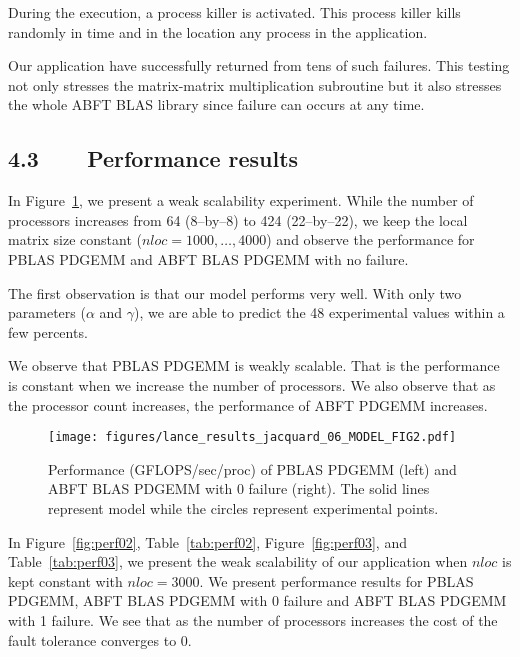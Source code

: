 \documentclass[pdftex,11pt]{article}
\begin{document}
During the execution, a process killer is activated.  This process
killer kills randomly in time and in the location any process in the
application.

Our application have successfully returned from tens of such failures.
This testing not only stresses the matrix-matrix multiplication
subroutine but it also stresses the whole ABFT BLAS library since
failure can occurs at any time.


\subsection*{\color{DodgerBlue4} 4.3~~~~Performance results}

In Figure~\ref{fig:perf01}, we present a weak scalability experiment.
While the number of processors increases from 64 (8--by--8) to 424
(22--by--22), we keep the local matrix size constant ($nloc = 1000,
\ldots, 4000$) and observe the performance for PBLAS PDGEMM and ABFT
BLAS PDGEMM with no failure.

The first observation is that our model performs very well. With only
two parameters ($\alpha$ and $\gamma$), we are able to predict the 48
experimental values within a few percents.

We observe that PBLAS PDGEMM is weakly scalable. That is the
performance is constant when we increase the number of processors. We
also observe that as the processor count increases, the performance of
ABFT PDGEMM increases.

\begin{figure}
  \color{DodgerBlue4}
  \begin{center}
    \texttt{[image: figures/lance\_results\_jacquard\_06\_MODEL\_FIG2.pdf]}
    \color{DodgerBlue4}
    \caption{\label{fig:perf01} \color{black} Performance
      (GFLOPS/sec/proc) of PBLAS PDGEMM (left) and ABFT BLAS PDGEMM
      with 0 failure (right).  The solid lines represent model while
      the circles represent experimental points.  }
  \end{center}
\end{figure}

In Figure~\ref{fig:perf02}, Table~\ref{tab:perf02},
Figure~\ref{fig:perf03}, and Table~\ref{tab:perf03}, we present the
weak scalability of our application when $nloc$ is kept constant with
$nloc=3000$. We present performance results for PBLAS PDGEMM, ABFT
BLAS PDGEMM with 0 failure and ABFT BLAS PDGEMM with 1 failure.  We
see that as the number of processors increases the cost of the fault
tolerance converges to 0.
\end{document}
